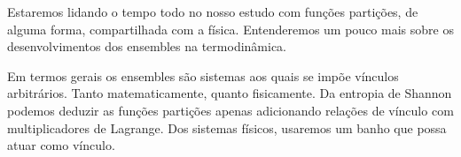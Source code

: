 Estaremos lidando o tempo todo no nosso estudo com funções partições, de alguma forma, compartilhada com a física. Entenderemos um pouco mais sobre os desenvolvimentos dos ensembles na termodinâmica.

Em termos gerais os ensembles são sistemas aos quais se impõe vínculos arbitrários. Tanto matematicamente, quanto fisicamente. Da entropia de Shannon podemos deduzir as funções partições apenas adicionando relações de vínculo com multiplicadores de Lagrange. Dos sistemas físicos, usaremos um banho que possa atuar como vínculo.